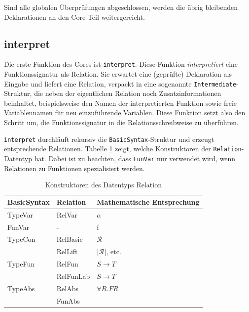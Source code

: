 Sind alle globalen Überprüfungen abgeschlossen, werden die übrig bleibenden Deklarationen an den Core-Teil weitergereicht.


\subsection{interpret}

Die erste Funktion des Cores ist \texttt{interpret}. Diese Funktion \textit{interpretiert} eine Funktionssignatur als Relation. Sie
erwartet eine (geprüfte) Deklaration als Eingabe und liefert eine Relation, verpackt in eine sogenannte \texttt{Intermediate}-Struktur,
die neben der eigentlichen Relation noch Zusatzinformationen beinhaltet, beispielsweise den Namen der interpretierten Funktion
sowie freie Variablennamen für neu einzuführende Variablen.
Diese Funktion setzt also den Schritt um, die Funktionssignatur in die Relationsschreibweise zu überführen.

\texttt{interpret} durchläuft rekursiv die \texttt{BasicSyntax}-Struktur und erzeugt entsprechende Relationen.
Tabelle \ref{tab:relations} zeigt, welche Konstruktoren der \texttt{Relation}-Datentyp hat. Dabei ist zu beachten, dass
\texttt{FunVar} nur verwendet wird, wenn Relationen zu Funktionen spezialisiert werden. 

\begin{table}
\centering
\begin{tabular}{| l | l | l |}
\hline
BasicSyntax & Relation & Mathematische Entsprechung\\
\hline
TypeVar & RelVar & $\alpha$ \\
FunVar & - & f \\
TypeCon & RelBasic & $\mathcal{R}$ \\
& RelLift & [$\mathcal{R}$], etc. \\
TypeFun & RelFun & $S \rightarrow T$ \\
& RelFunLab & $S \rightarrow T$ \\
TypeAbs & RelAbs & $\forall R . F R$ \\
& FunAbs &\\
\hline
\end{tabular}
\caption{Konstruktoren des Datentyps Relation}
\label{tab:relations}
\end{table}

